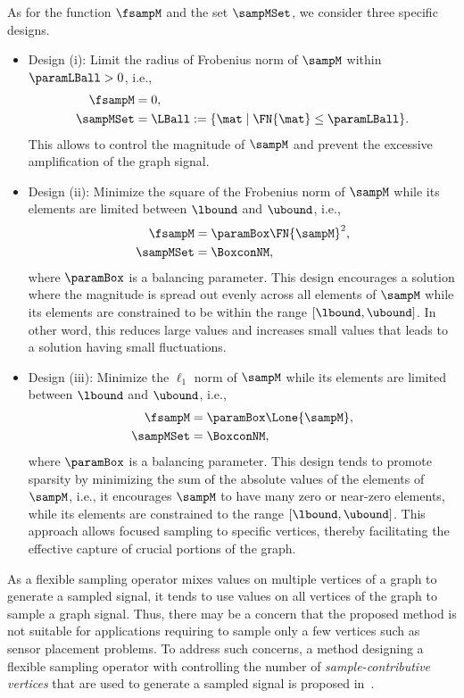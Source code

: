 \documentclass[journal]{IEEEtran}
\begin{document}
As for the function $\fsampM$ and the set $\sampMSet$, we consider three specific designs. 
\begin{itemize}[align=parleft, left=1.1mm, labelsep=1.1mm, itemindent=0mm]
    \item Design (i): Limit the radius of Frobenius norm of $\sampM$ within $\paramLBall >0$, i.e., 
    \begin{align} \label{prob:Lball}
        \fsampM &= 0, \nonumber \\ 
        \sampMSet &= \LBall := \{ \mat \; | \; \FN{\mat} \leq \paramLBall \}.
    \end{align}
    This allows to control the magnitude of $\sampM$ and prevent the excessive amplification of the graph signal.
    \item Design (ii): Minimize the square of the Frobenius norm of $\sampM$ while its elements are limited between $\lbound$ and $\ubound$, i.e.,
    \begin{align} \label{prob:FNandBox}
        \fsampM &= \paramBox \FN{\sampM}^2, \nonumber \\
        \sampMSet &= \BoxconNM,
    \end{align}
    where $\paramBox$ is a balancing parameter.
    This design encourages a solution where the magnitude is spread out evenly across all elements of $\sampM$ while its elements are constrained to be within the range $[\lbound, \ubound]$.
    In other word, this reduces large values and increases small values that leads to a solution having small fluctuations.
    \item Design (iii): Minimize the $\ell_1$ norm of $\sampM$ while its elements are limited between $\lbound$ and $\ubound$, i.e.,
    \begin{align} \label{prob:L1andBox}
        \fsampM &= \paramBox \Lone{\sampM}, \nonumber \\ 
        \sampMSet &= \BoxconNM,
    \end{align}
    where $\paramBox$ is a balancing parameter.
    This design tends to promote sparsity by minimizing the sum of the absolute values of the elements of $\sampM$, i.e., it encourages $\sampM$ to have many zero or near-zero elements, while its elements are constrained to the range $[\lbound, \ubound]$.
    This approach allows focused sampling to specific vertices, thereby facilitating the effective capture of crucial portions of the graph.
\end{itemize}

\begin{rem}
    \rm{
        As a flexible sampling operator mixes values on multiple vertices of a graph to generate a sampled signal, it tends to use values on all vertices of the graph to sample a graph signal.
        Thus, there may be a concern that the proposed method is not suitable for applications requiring to sample only a few vertices such as sensor placement problems.
        To address such concerns, a method designing a flexible sampling operator with controlling the number of \textit{sample-contributive vertices} that are used to generate a sampled signal is proposed in~\cite{yamashita2025icassp}.
    }
\end{rem}
\end{document}
